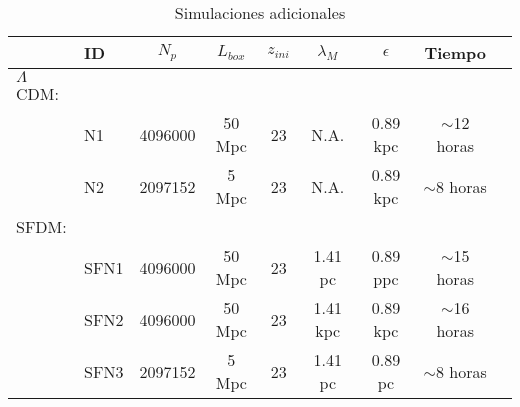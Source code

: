 \documentclass[a4paper,openright,12pt]{book}
\begin{document}
\begin{table}[]\footnotesize
\caption{Simulaciones adicionales}
\label{Tabla 4.5}\centering%
\begin{tabular}{llccccccl}
\toprule%
&ID&$N_{p}$&$L_{box}$&$z_{ini}$&$\lambda_{M}$&$\epsilon$&Tiempo \\\toprule%
$\Lambda$CDM:\\
&N1&4096000&50 Mpc&23&N.A.&0.89 kpc&$\sim$12 horas \\
&N2&2097152&5 Mpc&23&N.A.&0.89 kpc&$\sim$8 horas\\\midrule
SFDM:\\
&SFN1&4096000&50 Mpc&23&1.41 pc&0.89 ppc&$\sim$15 horas\\
&SFN2&4096000&50 Mpc&23&1.41 kpc&0.89 kpc&$\sim$16 horas\\
&SFN3&2097152&5 Mpc&23&1.41 pc&0.89 pc&$\sim$8 horas\\\bottomrule









\end{tabular}
\end{table}
\end{document}
